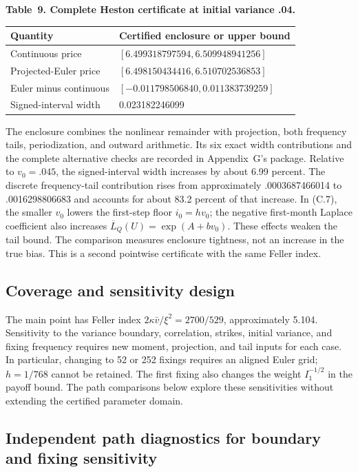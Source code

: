 \noindent\textbf{Table~9. Complete Heston certificate at initial variance .04.}
\begin{center}
\begin{tabularx}{\textwidth}{@{}l X@{}}
\toprule
Quantity & Certified enclosure or upper bound \\
\midrule
Continuous price & \([6.499318797594,6.509948941256]\) \\
Projected-Euler price & \([6.498150434416,6.510702536853]\) \\
Euler minus continuous & \([-0.011798506840,0.011383739259]\) \\
Signed-interval width & 0.023182246099 \\
\bottomrule
\end{tabularx}
\end{center}

The enclosure combines the nonlinear remainder with projection, both frequency
tails, periodization, and outward arithmetic. Its six exact width contributions
and the complete alternative checks are recorded in Appendix~G's package.
Relative to \(v_0=.045\), the signed-interval width increases by about
6.99 percent. The discrete frequency-tail contribution rises from approximately
.0003687466014 to .0016298806683 and accounts for about 83.2 percent of that
increase. In (C.7), the smaller \(v_0\) lowers the first-step floor
\(i_0=hv_0\); the negative first-month Laplace coefficient also increases
\(\overline L_Q(U)=\exp(A+bv_0)\). These effects weaken the tail bound.
The comparison measures enclosure tightness, not an increase in the true bias.
This is a second pointwise certificate with the same Feller index.

\subsection{Coverage and sensitivity design}

The main point has Feller index
\(2\kappa\bar v/\xi^2=2700/529\), approximately 5.104. Sensitivity to the
variance boundary, correlation, strikes, initial variance, and fixing frequency
requires new moment, projection, and tail inputs for each case. In particular,
changing to 52 or 252 fixings requires an aligned Euler grid; \(h=1/768\)
cannot be retained. The first fixing also changes the weight \(I_1^{-1/2}\)
in the payoff bound. The path comparisons below explore these sensitivities
without extending the certified parameter domain.

\subsection{Independent path diagnostics for boundary and fixing sensitivity}

